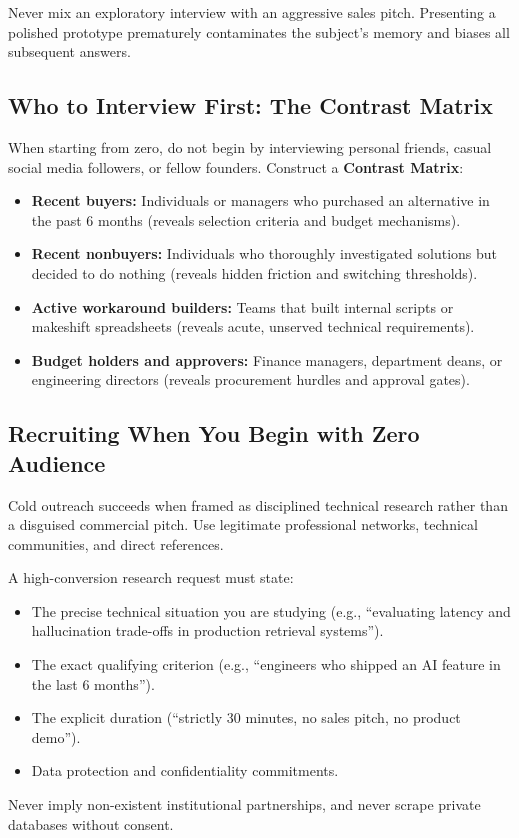 Never mix an exploratory interview with an aggressive sales pitch. Presenting a polished prototype prematurely contaminates the subject's memory and biases all subsequent answers.

\subsection{Who to Interview First: The Contrast Matrix}

When starting from zero, do not begin by interviewing personal friends, casual social media followers, or fellow founders. Construct a \textbf{Contrast Matrix}:
\begin{itemize}[leftmargin=1.2em,itemsep=0.2ex]
  \item \textbf{Recent buyers:} Individuals or managers who purchased an alternative in the past 6 months (reveals selection criteria and budget mechanisms).
  \item \textbf{Recent nonbuyers:} Individuals who thoroughly investigated solutions but decided to do nothing (reveals hidden friction and switching thresholds).
  \item \textbf{Active workaround builders:} Teams that built internal scripts or makeshift spreadsheets (reveals acute, unserved technical requirements).
  \item \textbf{Budget holders and approvers:} Finance managers, department deans, or engineering directors (reveals procurement hurdles and approval gates).
\end{itemize}

\subsection{Recruiting When You Begin with Zero Audience}

Cold outreach succeeds when framed as disciplined technical research rather than a disguised commercial pitch. Use legitimate professional networks, technical communities, and direct references.

A high-conversion research request must state:
\begin{itemize}[leftmargin=1.2em,itemsep=0.2ex]
  \item The precise technical situation you are studying (e.g., ``evaluating latency and hallucination trade-offs in production retrieval systems'').
  \item The exact qualifying criterion (e.g., ``engineers who shipped an AI feature in the last 6 months'').
  \item The explicit duration (``strictly 30 minutes, no sales pitch, no product demo'').
  \item Data protection and confidentiality commitments.
\end{itemize}
Never imply non-existent institutional partnerships, and never scrape private databases without consent.

